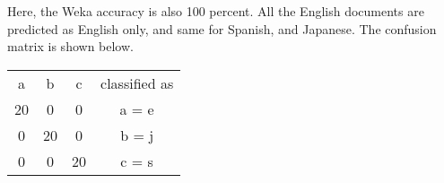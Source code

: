 \documentclass[a4paper]{article}
\theoremstyle{definition}
\newenvironment{soln}{
    \leavevmode\color{blue}\ignorespaces
}{}
\begin{document}
\begin{soln}
Here, the Weka accuracy is also 100 percent. All the English documents are predicted as English only, and same for Spanish, and Japanese. The confusion matrix is shown below. 

\begin{center}
\begin{tabular}{cccc}
a & b & c & classified as \\
20 & 0 & 0 & a = e\\
0 & 20 & 0 & b = j\\
0 & 0 & 20 & c = s

\end{tabular}
\end{center}
\end{soln}



\end{document}
